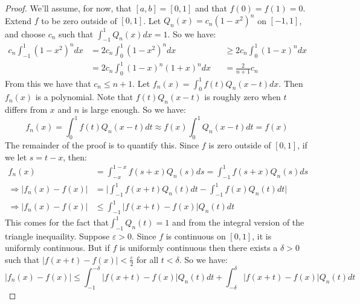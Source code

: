 \documentclass[crop=false,class=article,oneside]{standalone}
\begin{document}
        \begin{proof}
            We'll assume, for now, that $[a,b]=[0,1]$
            and that $f(0)=f(1)=0$. Extend $f$ to be
            zero outside of $[0,1]$. Let
            $Q_{n}(x)=c_{n}(1-x^{2})^{n}$ on $[-1,1]$,
            and choose $c_{n}$ such that
            $\int_{-1}^{1}Q_{n}(x)dx=1$. So we have:
            \begin{align*}
                c_{n}\int_{-1}^{1}(1-x^{2})^{n}dx
                &=2c_{n}\int_{0}^{1}(1-x^{2})^{n}dx
                &
                &\geq{2c_{n}}\int_{0}^{1}(1-x)^{n}dx\\
                &=2c_{n}\int_{0}^{1}(1-x)^{n}(1+x)^{n}dx
                &
                &=\frac{2}{n+1}c_{n}
            \end{align*}
        From this we have that $c_{n}\leq{n+1}$. Let
        $f_{n}(x)=\int_{0}^{1}f(t)Q_{n}(x-t)dx$.
        Then $f_{n}(x)$ is a polynomial. Note that
        $f(t)Q_{n}(x-t)$ is roughly zero when $t$ differs
        from $x$ and $n$ is large enough. So we have:
        \begin{equation*}
            f_{n}(x)=\int_{0}^{1}f(t)Q_{n}(x-t)dt
            \approx{f(x)}\int_{0}^{1}Q_{n}(x-t)dt=f(x)
        \end{equation*}
        The remainder of the proof is to quantify this.
        Since $f$ is zero outside of $[0,1]$, if
        we let $s=t-x$, then:
        \begin{align*}
            f_{n}(x)&=\int_{-x}^{1-x}f(s+x)Q_{n}(s)ds
            =\int_{-1}^{1}f(s+x)Q_{n}(s)ds\\
            \Rightarrow|f_{n}(x)-f(x)|
            &=\bigg|\int_{-1}^{1}f(x+t)Q_{n}(t)dt
            -\int_{-1}^{1}f(x)Q_{n}(t)dt\bigg|\\
            \Rightarrow|f_{n}(x)-f(x)|
            &\leq\int_{-1}^{1}|f(x+t)-f(x)|Q_{n}(t)dt
        \end{align*}
        This comes for the fact that$\int_{-1}^{1}Q_{n}(t)=1$
        and from the integral version of the triangle
        inequaility.
        Suppose $\varepsilon>0$. Since $f$ is continuous
        on $[0,1]$, it is uniformly continuous. But
        if $f$ is uniformly continuous then there exists
        a $\delta>0$ such that
        $|f(x+t)-f(x)|<\frac{\varepsilon}{2}$ for all
        $t<\delta$. So we have:
        \begin{equation*}
            |f_{n}(x)-f(x)|\leq
            \int_{-1}^{-\delta}|f(x+t)-f(x)|Q_{n}(t)dt
            +\int_{-\delta}^{\delta}|f(x+t)-f(x)|Q_{n}(t)dt

\end{equation*}
\end{proof}
\end{document}

